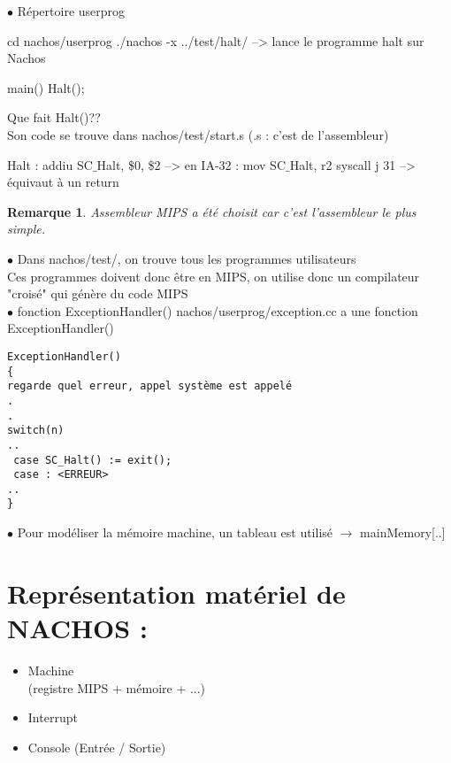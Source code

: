 \documentclass[12pt,a4paper]{report}
\newtheorem*{rem}{Remarque}
\begin{document}
\bigskip
$\bullet$ Répertoire userprog
\begin{verbatimtab}
cd nachos/userprog
./nachos -x ../test/halt/   --> lance le programme halt sur Nachos

 main()
{
 Halt();
}
\end{verbatimtab}

Que fait Halt()?? \\
Son code se trouve dans nachos/test/start.s (.s : c'est de l'assembleur)\\
\begin{verbatimtab}
Halt : addiu SC$\_$Halt, \$0, \$2     --> en IA-32 : mov SC$\_$Halt, r2
       syscall
       j 31            --> équivaut à un return
\end{verbatimtab}

\begin{rem}Assembleur MIPS a été choisit car c'est l'assembleur le plus simple.\end{rem}

\bigskip

$\bullet$ Dans nachos/test/, on trouve tous les programmes utilisateurs\\
Ces programmes doivent donc être en MIPS, on utilise donc un compilateur "croisé" qui génère du code MIPS\\

$\bullet$ fonction ExceptionHandler()
nachos/userprog/exception.cc a une fonction ExceptionHandler()
\begin{verbatim}
ExceptionHandler()  
{
regarde quel erreur, appel système est appelé
.
.
switch(n)
..
 case SC_Halt() := exit();
 case : <ERREUR>
..
}
\end{verbatim}

$\bullet$ Pour modéliser la mémoire machine, un tableau est utilisé $\rightarrow$ mainMemory[..]


\section{Représentation matériel de NACHOS :} 
\begin{itemize}
\item Machine\\
(registre MIPS + mémoire + ...)
\item Interrupt
\item Console
(Entrée / Sortie)
\\
\end{itemize}
\end{document}

